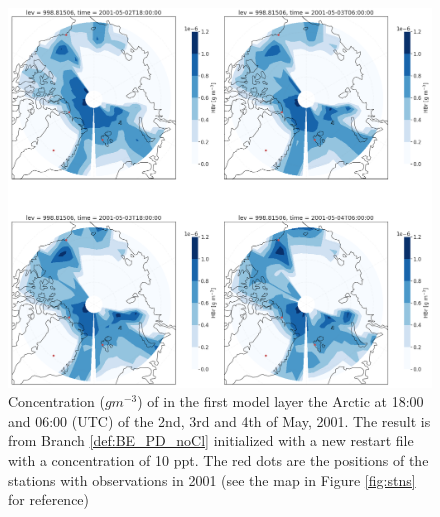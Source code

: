 \begin{figure}[h]
    \centering
    \includegraphics[width=\linewidth]{Chapter6_Results/images/Polar_StationComp_2001/HBr/polarHBr_newRestart.png}
    \caption{Concentration ($g m^{-3}$) of  in the first model layer the Arctic at 18:00 and 06:00 (UTC) of the 2nd, 3rd and 4th of May, 2001. The result is from Branch \ref{def:BE_PD_noCl} initialized with a new restart file with a  concentration of 10 ppt. The red dots are the positions of the stations with observations in 2001 (see the map in Figure \ref{fig:stns} for reference)}
    \label{fig:polarHBr_newRestart}
\end{figure}